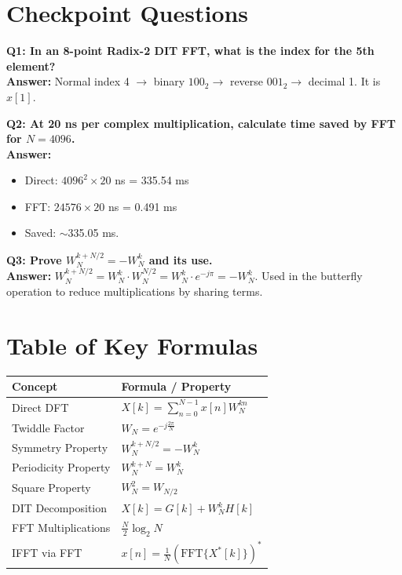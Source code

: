 \documentclass[11pt,a4paper]{article}
\begin{document}
\section{Checkpoint Questions}
\textbf{Q1: In an 8-point Radix-2 DIT FFT, what is the index for the 5th element?} \\
\textbf{Answer:} Normal index 4 $\rightarrow$ binary $100_2 \rightarrow$ reverse $001_2 \rightarrow$ decimal 1. It is $x[1]$.

\vspace{10pt}
\noindent
\textbf{Q2: At 20 ns per complex multiplication, calculate time saved by FFT for $N=4096$.} \\
\textbf{Answer:} 
\begin{itemize}
    \item Direct: $4096^2 \times 20$ ns = 335.54 ms
    \item FFT: $24576 \times 20$ ns = 0.491 ms
    \item Saved: $\sim$335.05 ms.
\end{itemize}

\vspace{10pt}
\noindent
\textbf{Q3: Prove $W_N^{k+N/2} = -W_N^k$ and its use.} \\
\textbf{Answer:} 
$W_N^{k+N/2} = W_N^k \cdot W_N^{N/2} = W_N^k \cdot e^{-j\pi} = -W_N^k$. Used in the butterfly operation to reduce multiplications by sharing terms.

\section{Table of Key Formulas}
\begin{table}[H]
\centering
\begin{tabular}{@{}ll@{}}
\toprule
\textbf{Concept} & \textbf{Formula / Property} \\ \midrule
Direct DFT & $X[k] = \sum_{n=0}^{N-1} x[n] W_N^{kn}$ \\
Twiddle Factor & $W_N = e^{-j \frac{2\pi}{N}}$ \\
Symmetry Property & $W_N^{k + N/2} = -W_N^k$ \\
Periodicity Property & $W_N^{k + N} = W_N^k$ \\
Square Property & $W_N^2 = W_{N/2}$ \\
DIT Decomposition & $X[k] = G[k] + W_N^k H[k]$ \\
FFT Multiplications & $\frac{N}{2}\log_2 N$ \\
IFFT via FFT & $x[n] = \frac{1}{N} ( \text{FFT}\{X^*[k]\} )^*$ \\ \bottomrule
\end{tabular}
\end{table}
\end{document}
